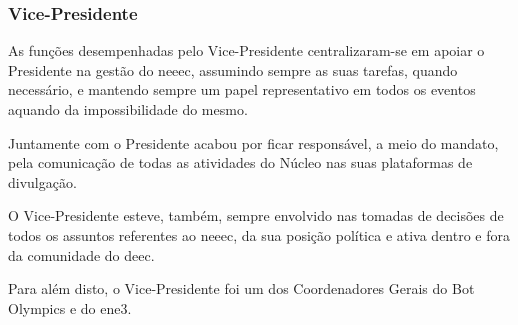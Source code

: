 
\subsubsection{Vice-Presidente}

As funções desempenhadas pelo Vice-Presidente centralizaram-se em apoiar o Presidente na gestão do \acrshort{neeec}, assumindo sempre as suas tarefas, quando necessário, e mantendo sempre um papel representativo em todos os eventos aquando da impossibilidade do mesmo.

Juntamente com o Presidente acabou por ficar responsável, a meio do mandato, pela comunicação de todas as atividades do Núcleo nas suas plataformas de divulgação.

O Vice-Presidente esteve, também, sempre envolvido nas tomadas de decisões de todos os assuntos referentes ao \acrshort{neeec}, da sua posição política e ativa dentro e fora da comunidade do \acrshort{deec}.

Para além disto, o Vice-Presidente foi um dos Coordenadores Gerais do Bot Olympics e do \acrshort{ene3}.